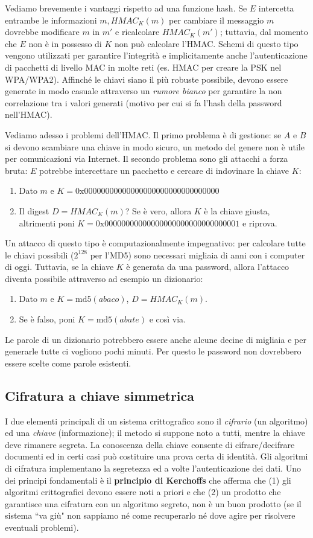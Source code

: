 Vediamo brevemente i vantaggi rispetto ad una funzione hash. Se $E$ intercetta entrambe le informazioni $m, HMAC_K(m)$ per cambiare il messaggio $m$ dovrebbe modificare $m$ in $m'$ e ricalcolare $HMAC_K(m')$; tuttavia, dal momento che $E$ non è in possesso di $K$ non può calcolare l'HMAC. Schemi di questo tipo vengono utilizzati per garantire l'integrità e implicitamente anche l'autenticazione di pacchetti di livello MAC in molte reti (es. HMAC per creare la PSK nel WPA/WPA2). Affinché le chiavi siano il più robuste possibile, devono essere generate in modo casuale attraverso un \textit{rumore bianco} per garantire la non correlazione tra i valori generati (motivo per cui si fa l'hash della password nell'HMAC).

Vediamo adesso i problemi dell'HMAC. Il primo problema è di gestione: se $A$ e $B$ si devono scambiare una chiave in modo sicuro, un metodo del genere non è utile per comunicazioni via Internet. Il secondo problema sono gli attacchi a forza bruta: $E$ potrebbe intercettare un pacchetto e cercare di indovinare la chiave $K$:
\begin{enumerate}
	\item Dato $m$ e $K=0\text{x}00000000000000000000000000000000$
	\item Il digest $D=HMAC_K(m)$? Se è vero, allora $K$ è la chiave giusta, altrimenti poni $K=0\text{x}00000000000000000000000000000001$ e riprova.
\end{enumerate}
Un attacco di questo tipo è computazionalmente impegnativo: per calcolare tutte le chiavi possibili ($2^{128}$ per l'MD5) sono necessari migliaia di anni con i computer di oggi. Tuttavia, se la chiave $K$ è generata da una password, allora l'attacco diventa possibile attraverso ad esempio un dizionario:
\begin{enumerate}
	\item Dato $m$ e $K=\text{md5}(abaco)$, $D=HMAC_K(m)$.
	\item Se è falso, poni $K=\text{md5}(abate)$ e così via.
\end{enumerate}
Le parole di un dizionario potrebbero essere anche alcune decine di migliaia e per generarle tutte ci vogliono pochi minuti. Per questo le password non dovrebbero essere scelte come parole esistenti.

\subsection{Cifratura a chiave simmetrica}
I due elementi principali di un sistema crittografico sono il \textit{cifrario} (un algoritmo) ed una \textit{chiave} (informazione); il metodo si suppone noto a tutti, mentre la chiave deve rimanere segreta. La conoscenza della chiave consente di cifrare/decifrare documenti ed in certi casi può costituire una prova certa di identità. Gli algoritmi di cifratura implementano la segretezza ed a volte l'autenticazione dei dati. Uno dei principi fondamentali è il \textbf{principio di Kerchoffs} che afferma che (1) gli algoritmi crittografici devono essere noti a priori e che (2) un prodotto che garantisce una cifratura con un algoritmo segreto, non è un buon prodotto (se il sistema \textquotedblleft va giù" non sappiamo né come recuperarlo né dove agire per risolvere eventuali problemi).

